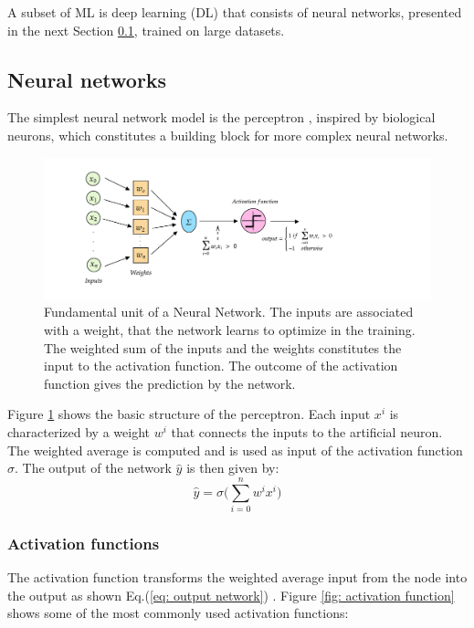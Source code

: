 A subset of ML is deep learning (DL) that consists of neural networks, presented in the next Section \ref{subsection: NN}, trained on large datasets.

\subsection{Neural networks} \label{subsection: NN}

The simplest neural network model is the perceptron \cite{perceptrons}, inspired by biological neurons, which constitutes a building block for more complex neural networks. 

\begin{figure}[hbt]
    \centering
    \includegraphics[width=0.8\linewidth]{Images/5.SPANet/one neuron.pdf}
    \caption{Fundamental unit of a Neural Network. The inputs are associated with a weight, that the network learns to optimize in the training. The weighted sum of the inputs and the weights constitutes the input to the activation function. The outcome of the activation function gives the prediction by the network.}
    \label{fig: neuron}
\end{figure}

Figure \ref{fig: neuron} shows the basic structure of the perceptron. Each input $x^i$ is characterized by a weight $w^i$ that connects the inputs to the artificial neuron. The weighted average is computed and is used as input of the activation function $\sigma$. The output of the network $\hat{y}$ is then given by:
\begin{equation}
    \hat{y}=\sigma\bigg(\sum_{i=0}^n w^i x^i\bigg)
    \label{eq: output network}
\end{equation}

\subsubsection{Activation functions}
The activation function transforms the weighted average input from the node into the output as shown Eq.(\ref{eq: output network}) \cite{ACTIVATION_FUNCTION}. Figure \ref{fig: activation function} shows some of the most commonly used activation functions:

